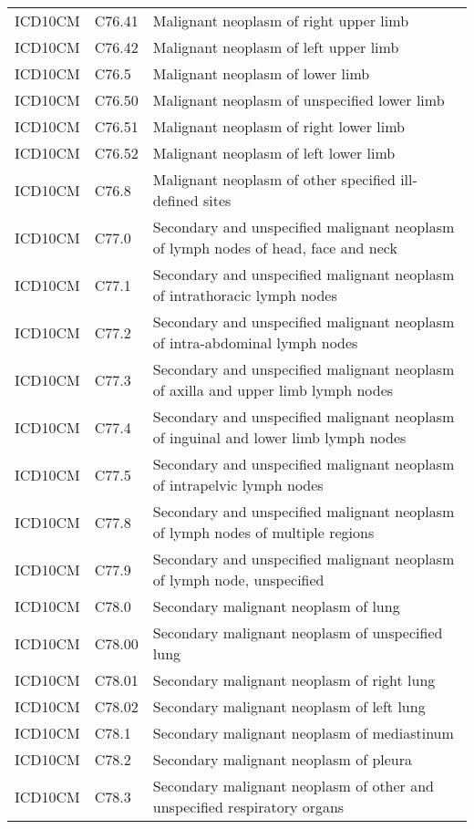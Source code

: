\begin{longtable}{p{}p{}p{}}
  ICD10CM & C76.41 & Malignant neoplasm of right upper limb \\ 
  ICD10CM & C76.42 & Malignant neoplasm of left upper limb \\ 
  ICD10CM & C76.5 & Malignant neoplasm of lower limb \\ 
  ICD10CM & C76.50 & Malignant neoplasm of unspecified lower limb \\ 
  ICD10CM & C76.51 & Malignant neoplasm of right lower limb \\ 
  ICD10CM & C76.52 & Malignant neoplasm of left lower limb \\ 
  ICD10CM & C76.8 & Malignant neoplasm of other specified ill-defined sites \\ 
  ICD10CM & C77.0 & Secondary and unspecified malignant neoplasm of lymph nodes of head, face and neck \\ 
  ICD10CM & C77.1 & Secondary and unspecified malignant neoplasm of intrathoracic lymph nodes \\ 
  ICD10CM & C77.2 & Secondary and unspecified malignant neoplasm of intra-abdominal lymph nodes \\ 
  ICD10CM & C77.3 & Secondary and unspecified malignant neoplasm of axilla and upper limb lymph nodes \\ 
  ICD10CM & C77.4 & Secondary and unspecified malignant neoplasm of inguinal and lower limb lymph nodes \\ 
  ICD10CM & C77.5 & Secondary and unspecified malignant neoplasm of intrapelvic lymph nodes \\ 
  ICD10CM & C77.8 & Secondary and unspecified malignant neoplasm of lymph nodes of multiple regions \\ 
  ICD10CM & C77.9 & Secondary and unspecified malignant neoplasm of lymph node, unspecified \\ 
  ICD10CM & C78.0 & Secondary malignant neoplasm of lung \\ 
  ICD10CM & C78.00 & Secondary malignant neoplasm of unspecified lung \\ 
  ICD10CM & C78.01 & Secondary malignant neoplasm of right lung \\ 
  ICD10CM & C78.02 & Secondary malignant neoplasm of left lung \\ 
  ICD10CM & C78.1 & Secondary malignant neoplasm of mediastinum \\ 
  ICD10CM & C78.2 & Secondary malignant neoplasm of pleura \\ 
  ICD10CM & C78.3 & Secondary malignant neoplasm of other and unspecified respiratory organs \\ 

\end{longtable}

